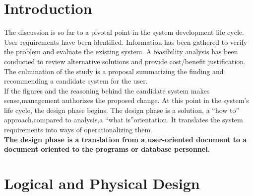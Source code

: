 \documentclass[a4paper,12pt]{report}
\begin{document}
\section{Introduction}
The discussion is so far to a pivotal point in the system development life cycle. User requirements have been identified. Information has been gathered to verify the problem and evaluate the existing system. A feasibility analysis has been conducted to review alternative solutions and provide cost/benefit justification.  The culmination of the study is a proposal summarizing the finding and recommending a candidate system for the user.\\

If the figures and the reasoning behind the candidate system makes sense,management authorizes the proposed change. At this point in the system's life cycle, the design phase begins. The design phase is a solution, a “how to” approach,compared to analysis,a “what is”orientation. It translates the system requirements into ways of operationalizing them.\\
\textbf{The design phase is a translation from a user-oriented document to a document oriented to the programs or database personnel.} 
\section{Logical and Physical Design}
\end{document}
